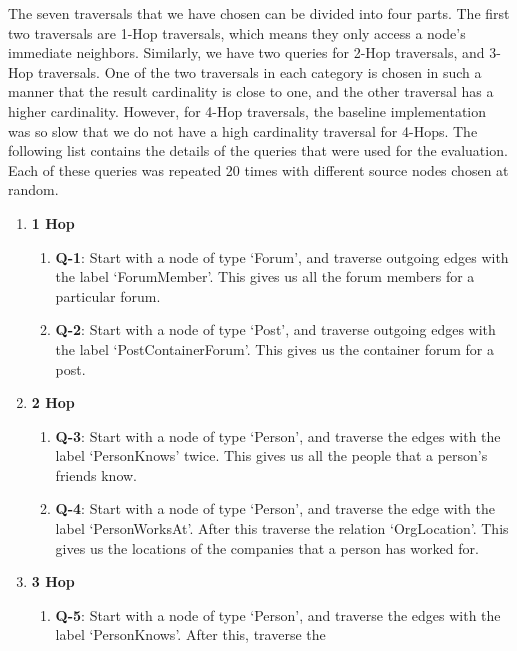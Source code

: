 \smallskip
The seven traversals that we have chosen can be divided into four parts. The
first two traversals are 1-Hop traversals, which means they only access a node's
immediate neighbors. Similarly, we have two queries for 2-Hop traversals, and
3-Hop traversals. One of the two traversals in each category is chosen in such a
manner that the result cardinality is close to one, and the other traversal has a
higher cardinality. However, for 4-Hop traversals, the baseline implementation
was so slow that we do not have a high cardinality traversal for 4-Hops. The
following list contains the details of the queries that were used for the
evaluation. Each of these queries was repeated 20 times with different source
nodes chosen at random.
\begin{enumerate}
    \item \textbf{1 Hop}
        \begin{enumerate}
            \item \textbf{Q-1}: Start with a node of type `Forum', and traverse outgoing
                edges with the label `ForumMember'. This gives us all the forum members for
                a particular forum.
            \item \textbf{Q-2}: Start with a node of type `Post', and traverse outgoing
                edges with the label `PostContainerForum'. This gives us the container forum
                for a post.
        \end{enumerate}
    \item \textbf{2 Hop}
        \begin{enumerate}
            \item \textbf{Q-3}: Start with a node of type `Person', and traverse
                the edges with the label `PersonKnows' twice. This gives us all the
                people that a person's friends know.
            \item \textbf{Q-4}: Start with a node of type `Person', and traverse
                the edge with the label `PersonWorksAt'. After this traverse the
                relation `OrgLocation'. This gives us the locations of the
                companies that a person has worked for.
        \end{enumerate}
    \item \textbf{3 Hop}
        \begin{enumerate}
            \item \textbf{Q-5}: Start with a node of type `Person', and traverse
                the edges with the label `PersonKnows'. After this, traverse the

\end{enumerate}
\end{enumerate}
